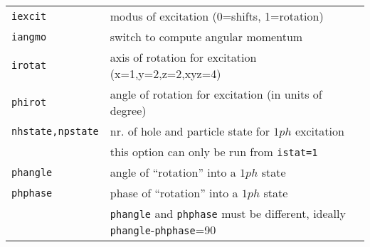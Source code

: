 \documentclass[12pt]{article}
\begin{document}
\begin{tabular}{ll}
{\tt iexcit} & modus of excitation (0=shifts, 1=rotation)\\
{\tt iangmo} & switch to compute angular momentum\\
{\tt irotat} & axis of rotation for excitation (x=1,y=2,z=2,xyz=4)\\
{\tt phirot} & angle of rotation for excitation (in units of degree)\\
{\tt nhstate,npstate}& nr. of hole and particle state for $1ph$
                      excitation\\
                     & this option can only be run from {\tt istat=1}
\\
{\tt phangle}        & angle of ``rotation'' into a $1ph$ state\\
{\tt phphase}        & phase of ``rotation'' into a $1ph$ state\\
& {\tt phangle} and {\tt phphase} must be different, ideally
 {\tt phangle}-{\tt phphase}=90\\
\hline
\end{tabular}
\end{document}
